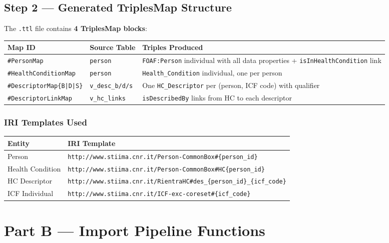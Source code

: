 ﻿\documentclass[12pt,a4paper]{article}
\begin{document}
\subsection{Step 2 --- Generated TriplesMap Structure}

The \texttt{.ttl} file contains \textbf{4 TriplesMap blocks}:

\begin{longtable}{@{}P{2cm}P{3.5cm}P{9cm}@{}}
\toprule
\textbf{Map ID} & \textbf{Source Table} & \textbf{Triples Produced} \\
\midrule
\endhead
\texttt{\#PersonMap} & \texttt{person} & \texttt{FOAF:Person} individual with all data properties + \texttt{isInHealthCondition} link \\
\texttt{\#HealthConditionMap} & \texttt{person} & \texttt{Health\_Condition} individual, one per person \\
\texttt{\#DescriptorMap\{B|D|S\}} & \texttt{v\_desc\_b/d/s} & One \texttt{HC\_Descriptor} per (person, ICF code) with qualifier \\
\texttt{\#DescriptorLinkMap} & \texttt{v\_hc\_links} & \texttt{isDescribedBy} links from HC to each descriptor \\
\bottomrule
\end{longtable}

\subsubsection*{IRI Templates Used}
\begin{longtable}{@{}P{5cm}P{9.5cm}@{}}
\toprule
\textbf{Entity} & \textbf{IRI Template} \\
\midrule
\endhead
Person & \texttt{http://www.stiima.cnr.it/Person-CommonBox\#\{person\_id\}} \\
Health Condition & \texttt{http://www.stiima.cnr.it/Person-CommonBox\#HC\{person\_id\}} \\
HC Descriptor & \texttt{http://www.stiima.cnr.it/RientraHC\#des\_\{person\_id\}\_\{icf\_code\}} \\
ICF Individual & \texttt{http://www.stiima.cnr.it/ICF-exc-coreset\#\{icf\_code\}} \\
\bottomrule
\end{longtable}

\clearpage
\section{Part B --- Import Pipeline Functions}
\end{document}
